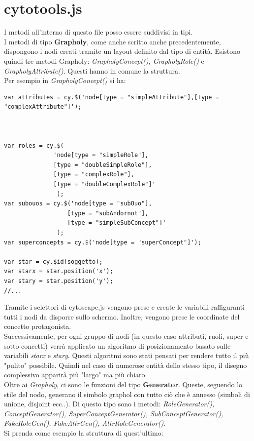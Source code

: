 \documentclass[Lau,binding=0.6cm]{sapthesis}
\begin{document}
\section{cytotools.js}
I metodi all'interno di questo file posso essere suddivisi in tipi.
\\I metodi di tipo \textbf{Grapholy}, come anche scritto anche precedentemente, dispongono i nodi creati tramite un layout definito dal tipo di entità. Esistono quindi tre metodi Grapholy: \textit{GrapholyConcept(), GrapholyRole()} e \textit{GrapholyAttribute()}.
Questi hanno in comune la struttura. \\Per esempio in  \textit{GrapholyConcept()} si ha:
\begin{verbatim}
var attributes = cy.$('node[type = "simpleAttribute"],[type = "complexAttribute"]');



var roles = cy.$(
              'node[type = "simpleRole"],
              [type = "doubleSimpleRole"],
              [type = "complexRole"],
              [type = "doubleComplexRole"]'
               );
var subouos = cy.$('node[type = "subOuo"],
                  [type = "subAndornot"],
                  [type = "simpleSubConcept"]'
               );
var superconcepts = cy.$('node[type = "superConcept"]');
   
var star = cy.$id(soggetto);
var starx = star.position('x');
var stary = star.position('y');
//...
\end{verbatim}
Tramite i selettori di cytoscape.js vengono prese e create le variabili raffiguranti tutti i nodi da disporre sullo schermo.
Inoltre, vengono prese le coordinate del concetto protagonista.
\\Successivamente, per ogni gruppo di nodi (in questo caso attributi, ruoli, super  e sotto concetti) verrà applicato un algoritmo di posizionamento basato sulle variabili \textit{starx} e \textit{stary}. Questi algoritmi sono stati pensati per rendere tutto il più "pulito" possibile. Quindi nel caso di numerose entità dello stesso tipo, il disegno complessivo apparirà più "largo" ma più chiaro.
\\Oltre ai \textit{Grapholy}, ci sono le funzioni del tipo \textbf{Generator}. Queste, seguendo lo stile del nodo, generano il simbolo graphol con tutto ciò che è annesso (simboli di unione, disjoint ecc..).
Di questo tipo sono i metodi: \textit{RoleGenerator(), ConceptGenerator(), SuperConceptGenerator(), SubConceptGenerator(), FakeRoleGen(), FakeAttrGen(), AttrRoleGenerator()}.
\\Si prenda come esempio la struttura di quest'ultimo:
\end{document}
